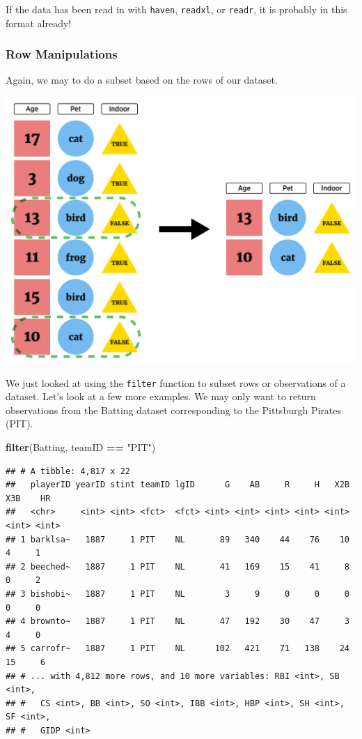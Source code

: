 \documentclass[
]{book}
\newenvironment{Shaded}{\begin{snugshade}}{\end{snugshade}}
\newcommand{\KeywordTok}[1]{\textcolor[rgb]{0.13,0.29,0.53}{\textbf{#1}}}
\newcommand{\NormalTok}[1]{#1}
\newcommand{\OperatorTok}[1]{\textcolor[rgb]{0.81,0.36,0.00}{\textbf{#1}}}
\newcommand{\StringTok}[1]{\textcolor[rgb]{0.31,0.60,0.02}{#1}}
\theoremstyle{definition}
\theoremstyle{definition}
\theoremstyle{definition}
\theoremstyle{remark}
\begin{document}
If the data has been read in with \texttt{haven}, \texttt{readxl}, or \texttt{readr}, it is probably in this format already!

\hypertarget{row-manipulations}{%
\subsubsection{Row Manipulations}\label{row-manipulations}}

Again, we may to do a subset based on the rows of our dataset.

\begin{center}\includegraphics[width=0.8\linewidth]{img/filterVisualF} \end{center}

We just looked at using the \texttt{filter} function to subset rows or observations of a dataset. Let's look at a few more examples. We may only want to return observations from the Batting dataset corresponding to the Pittsburgh Pirates (PIT).

\begin{Shaded}
\begin{Highlighting}[]
\KeywordTok{filter}\NormalTok{(Batting, teamID }\OperatorTok{==}\StringTok{ "PIT"}\NormalTok{)}
\end{Highlighting}
\end{Shaded}

\begin{verbatim}
## # A tibble: 4,817 x 22
##   playerID yearID stint teamID lgID      G    AB     R     H   X2B   X3B    HR
##   <chr>     <int> <int> <fct>  <fct> <int> <int> <int> <int> <int> <int> <int>
## 1 barklsa~   1887     1 PIT    NL       89   340    44    76    10     4     1
## 2 beeched~   1887     1 PIT    NL       41   169    15    41     8     0     2
## 3 bishobi~   1887     1 PIT    NL        3     9     0     0     0     0     0
## 4 brownto~   1887     1 PIT    NL       47   192    30    47     3     4     0
## 5 carrofr~   1887     1 PIT    NL      102   421    71   138    24    15     6
## # ... with 4,812 more rows, and 10 more variables: RBI <int>, SB <int>,
## #   CS <int>, BB <int>, SO <int>, IBB <int>, HBP <int>, SH <int>, SF <int>,
## #   GIDP <int>
\end{verbatim}
\end{document}
